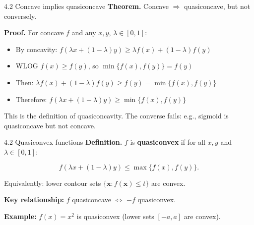 \documentclass[11pt,aspectratio=169]{beamer}
\begin{document}
\begin{frame}{4.2 Concave implies quasiconcave}
  \small
  \textbf{Theorem.} Concave $\Rightarrow$ quasiconcave, but not conversely.
  
  \textbf{Proof.} For concave $f$ and any $x, y$, $\lambda \in [0,1]$:
  
  \begin{itemize}
    \item By concavity: $f(\lambda x + (1-\lambda)y) \geq \lambda f(x) + (1-\lambda)f(y)$
    
    \item WLOG $f(x) \geq f(y)$, so $\min\{f(x),f(y)\} = f(y)$
    
    \item Then: $\lambda f(x) + (1-\lambda)f(y) \geq f(y) = \min\{f(x),f(y)\}$
    
    \item Therefore: $f(\lambda x + (1-\lambda)y) \geq \min\{f(x),f(y)\}$
  \end{itemize}
  
  This is the definition of quasiconcavity. The converse fails: e.g., sigmoid is quasiconcave but not concave.
\end{frame}

\begin{frame}{4.2 Quasiconvex functions}
  \small
  \textbf{Definition.} $f$ is \textbf{quasiconvex} if for all $x, y$ and $\lambda \in [0,1]$:
  
  \[
    f(\lambda x + (1-\lambda)y) \leq \max\{f(x), f(y)\}.
  \]
  
  Equivalently: lower contour sets $\{\mathbf{x}: f(\mathbf{x}) \leq t\}$ are convex.
  
  \textbf{Key relationship:} $f$ quasiconcave $\Leftrightarrow$ $-f$ quasiconvex.
  
  \textbf{Example:} $f(x) = x^2$ is quasiconvex (lower sets $[-a, a]$ are convex).
\end{frame}
\end{document}
